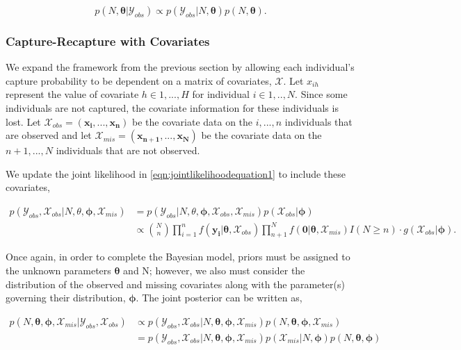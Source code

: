 \documentclass[
  12pt,
]{article}
\begin{document}
\begin{equation}
\label{eqn:simpleposteriorclassical}
p(N,\boldsymbol{\theta}|\mathcal{Y}_{obs}) \propto p(\mathcal{Y}_{obs}|N,\boldsymbol{\theta})p(N,\boldsymbol{\theta}).
\end{equation}

\subsubsection{Capture-Recapture with Covariates}
\label{sec:CRwithcovariates}

We expand the framework from the previous section by allowing each
individual's capture probability to be dependent on a matrix of
covariates, \(\mathcal{X}\). Let \(x_{ih}\) represent the value of
covariate \(h \in 1,...,H\) for individual \(i \in 1,..,N\). Since some
individuals are not captured, the covariate information for these
individuals is lost. Let
\(\mathcal{X}_{obs}=(\boldsymbol{x_i},...,\boldsymbol{x_n})\) be the
covariate data on the \(i,...,n\) individuals that are observed and let
\(\mathcal{X}_{mis}=(\boldsymbol{x_{n+1}},...,\boldsymbol{x_N})\) be the
covariate data on the \(n+1,...,N\) individuals that are not observed.

We update the joint likelihood in \autoref{eqn:jointlikelihoodequation1}
to include these covariates,

\begin{align}
\label{eqn:jointlikelihoodequation2}
\nonumber p(\mathcal{Y}_{obs},\mathcal{X}_{obs}|N,\theta,\boldsymbol{\phi},\mathcal{X}_{mis}) & = p(\mathcal{Y}_{obs}|N,\theta,\boldsymbol{\phi},\mathcal{X}_{obs},\mathcal{X}_{mis})p(\mathcal{X}_{obs}|\boldsymbol{\phi})\\
& \propto \binom{N}{n} \prod_{i=1}^n f(\boldsymbol{y_i}|\boldsymbol{\theta},\mathcal{X}_{obs})\prod_{n+1}^N f(\boldsymbol{0}|\boldsymbol{\theta},\mathcal{X}_{mis})I(N\ge n)\cdot g(\mathcal{X}_{obs}|\boldsymbol{\phi}).
\end{align}

Once again, in order to complete the Bayesian model, priors must be
assigned to the unknown parameters \(\boldsymbol{\theta}\) and N;
however, we also must consider the distribution of the observed and
missing covariates along with the parameter(s) governing their
distribution, \(\boldsymbol{\phi}\). The joint posterior can be written
as,

\begin{align}
\label{eqn:fullposteriorderive}
\nonumber p(N,\boldsymbol{\theta},\boldsymbol{\phi},\mathcal{X}_{mis}|\mathcal{Y}_{obs},\mathcal{X}_{obs}) & \propto p(\mathcal{Y}_{obs},\mathcal{X}_{obs}|N,\boldsymbol{\theta},\boldsymbol{\phi},\mathcal{X}_{mis})p(N,\boldsymbol{\theta},\boldsymbol{\phi},\mathcal{X}_{mis}) \\
& = p(\mathcal{Y}_{obs},\mathcal{X}_{obs}|N,\boldsymbol{\theta},\boldsymbol{\phi},\mathcal{X}_{mis})p(\mathcal{X}_{mis}|N,\boldsymbol{\phi})p(N,\boldsymbol{\theta},\boldsymbol{\phi})
\end{align}
\end{document}
